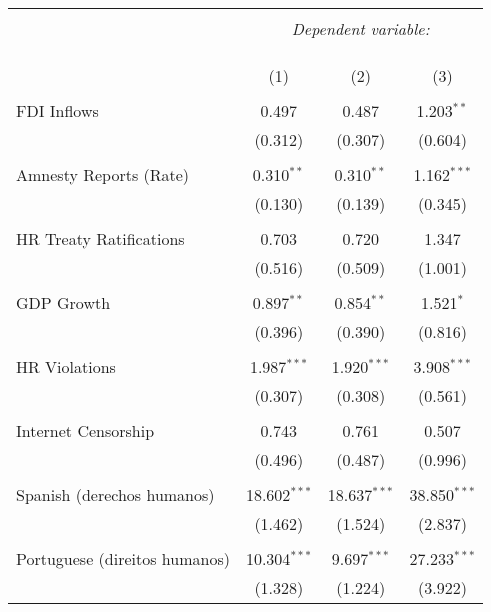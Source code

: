 
\begin{table}[!htbp] \centering 
  \caption{} 
  \label{} 
\begin{tabular}{@{\extracolsep{5pt}}lccc} 
\\[-1.8ex]\hline 
\hline \\[-1.8ex] 
 & \multicolumn{3}{c}{\textit{Dependent variable:}} \\ 
\cline{2-4} 
\\[-1.8ex] & \multicolumn{3}{c}{ } \\ 
\\[-1.8ex] & (1) & (2) & (3)\\ 
\hline \\[-1.8ex] 
 FDI Inflows & 0.497 & 0.487 & 1.203$^{**}$ \\ 
  & (0.312) & (0.307) & (0.604) \\ 
  & & & \\ 
 Amnesty Reports (Rate) & 0.310$^{**}$ & 0.310$^{**}$ & 1.162$^{***}$ \\ 
  & (0.130) & (0.139) & (0.345) \\ 
  & & & \\ 
 HR Treaty Ratifications & 0.703 & 0.720 & 1.347 \\ 
  & (0.516) & (0.509) & (1.001) \\ 
  & & & \\ 
 GDP Growth & 0.897$^{**}$ & 0.854$^{**}$ & 1.521$^{*}$ \\ 
  & (0.396) & (0.390) & (0.816) \\ 
  & & & \\ 
 HR Violations & 1.987$^{***}$ & 1.920$^{***}$ & 3.908$^{***}$ \\ 
  & (0.307) & (0.308) & (0.561) \\ 
  & & & \\ 
 Internet Censorship & 0.743 & 0.761 & 0.507 \\ 
  & (0.496) & (0.487) & (0.996) \\ 
  & & & \\ 
 Spanish (derechos humanos) & 18.602$^{***}$ & 18.637$^{***}$ & 38.850$^{***}$ \\ 
  & (1.462) & (1.524) & (2.837) \\ 
  & & & \\ 
 Portuguese (direitos humanos) & 10.304$^{***}$ & 9.697$^{***}$ & 27.233$^{***}$ \\ 
  & (1.328) & (1.224) & (3.922) \\ 

\end{tabular}
\end{table}
